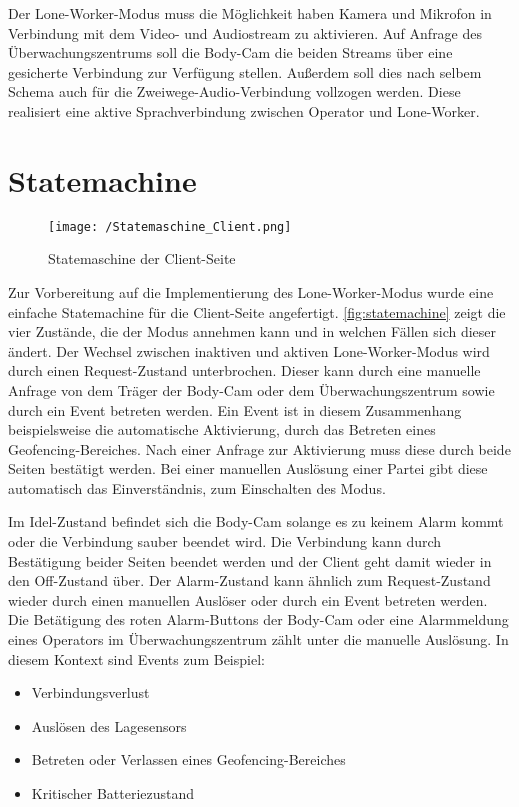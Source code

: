 \documentclass[thesis.tex]{subfiles}
\begin{document}
Der Lone-Worker-Modus muss die Möglichkeit haben Kamera und Mikrofon in Verbindung mit dem Video- und Audiostream zu aktivieren.
Auf Anfrage des Überwachungszentrums soll die Body-Cam die beiden Streams über eine gesicherte Verbindung zur Verfügung stellen.
Außerdem soll dies nach selbem Schema auch für die Zweiwege-Audio-Verbindung vollzogen werden.
Diese realisiert eine aktive Sprachverbindung zwischen Operator und Lone-Worker.


\section{Statemachine}

\begin{figure}[h]
    \centering
    \texttt{[image: /Statemaschine\_Client.png]}
    \caption{Statemaschine der Client-Seite}
    \label{fig:statemachine}
\end{figure}

Zur Vorbereitung auf die Implementierung des Lone-Worker-Modus wurde eine einfache Statemachine für die Client-Seite angefertigt.
\autoref{fig:statemachine} zeigt die vier Zustände, die der Modus annehmen kann und in welchen Fällen sich dieser ändert.
Der Wechsel zwischen inaktiven und aktiven Lone-Worker-Modus wird durch einen Request-Zustand unterbrochen.
Dieser kann durch eine manuelle Anfrage von dem Träger der Body-Cam oder dem Überwachungszentrum sowie durch ein Event betreten werden.
Ein Event ist in diesem Zusammenhang beispielsweise die automatische Aktivierung, durch das Betreten eines Geofencing-Bereiches.
Nach einer Anfrage zur Aktivierung muss diese durch beide Seiten bestätigt werden.
Bei einer manuellen Auslösung einer Partei gibt diese automatisch das Einverständnis, zum Einschalten des Modus.

Im Idel-Zustand befindet sich die Body-Cam solange es zu keinem Alarm kommt oder die Verbindung sauber beendet wird.
Die Verbindung kann durch Bestätigung beider Seiten beendet werden und der Client geht damit wieder in den Off-Zustand über.
Der Alarm-Zustand kann ähnlich zum Request-Zustand wieder durch einen manuellen Auslöser oder durch ein Event betreten werden.
Die Betätigung des roten Alarm-Buttons der Body-Cam oder eine Alarmmeldung eines Operators im Überwachungszentrum zählt unter die manuelle Auslösung.
In diesem Kontext sind Events zum Beispiel:
\begin{itemize}
    \item Verbindungsverlust
    \item Auslösen des Lagesensors
    \item Betreten oder Verlassen eines Geofencing-Bereiches
    \item Kritischer Batteriezustand
\end{itemize}
\end{document}
